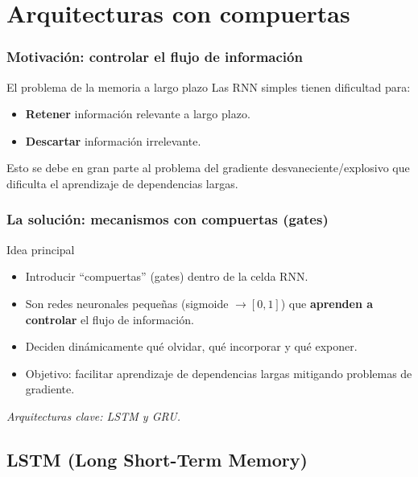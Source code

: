 \documentclass[handout]{beamer}
\begin{document}
\section{Arquitecturas con compuertas}

\begin{frame}
    \frametitle{Motivación: controlar el flujo de información}
    \begin{block}{El problema de la memoria a largo plazo}
        Las RNN simples tienen dificultad para:
        \begin{itemize}
            \item \textbf{Retener} información relevante a largo plazo.
            \item \textbf{Descartar} información irrelevante.
        \end{itemize}
        Esto se debe en gran parte al problema del gradiente desvaneciente/explosivo que dificulta el aprendizaje de dependencias largas.
    \end{block}
\end{frame}

\begin{frame}
    \frametitle{La solución: mecanismos con compuertas (gates)}
    \begin{alertblock}{Idea principal}
        \begin{itemize}
            \item Introducir ``compuertas'' (gates) dentro de la celda RNN.
            \item Son redes neuronales pequeñas (sigmoide $\rightarrow [0, 1]$) que \textbf{aprenden a controlar} el flujo de información.
            \item Deciden dinámicamente qué olvidar, qué incorporar y qué exponer.
            \item Objetivo: facilitar aprendizaje de dependencias largas mitigando problemas de gradiente.
        \end{itemize}
    \end{alertblock} \bigskip
    \begin{center}
     \textit{Arquitecturas clave: LSTM y GRU.}
    \end{center}
\end{frame}

\subsection{LSTM (Long Short-Term Memory)}
\end{document}
